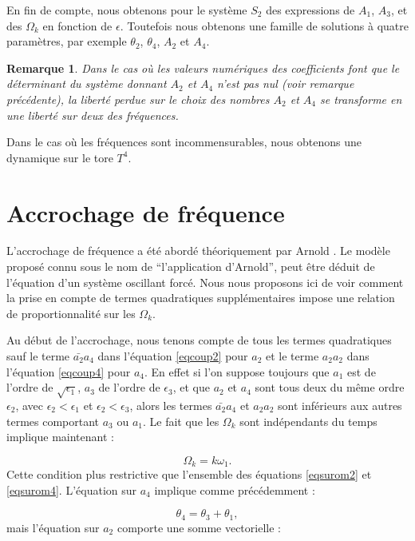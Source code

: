 \documentclass{book}
\newtheorem{rem}{Remarque}[chapter]
\begin{document}
En fin de compte, nous obtenons pour le syst\`eme $S_2$ des
expressions de $A_1$, $A_3$, et des $\Omega_k$ en fonction de
$\epsilon$. Toutefois nous obtenons une famille de solutions \`a quatre
param\`etres, par exemple $\theta_2$, $\theta_4$, $A_2$ et $A_4$.
\begin{rem}
Dans le cas o\`u les valeurs num\'eriques des coefficients font que le
d\'eterminant du syst\`eme donnant $A_2$ et $A_4$ n'est pas nul (voir
remarque pr\'ec\'edente), la libert\'e perdue sur le choix des nombres
$A_2$ et $A_4$ se transforme en une libert\'e sur deux des
fr\'equences. 
\end{rem}
Dans le cas o\`u les fr\'equences sont incommensurables, nous obtenons
une dynamique sur le tore $T^4$.


\section{Accrochage de fr\'equence}

L'accrochage de fr\'equence a \'et\'e abord\'e th\'eoriquement par
Arnold \cite{Arnold67,Nayfeh95}. Le mod\`ele propos\'e connu sous le
nom de ``l'application d'Arnold'', peut \^etre d\'eduit de
l'\'equation d'un syst\`eme oscillant forc\'e. Nous nous
proposons ici de voir comment la prise en compte de termes
quadratiques suppl\'ementaires impose une relation de
proportionnalit\'e sur les $\Omega_k$.

Au d\'ebut de l'accrochage, nous tenons compte de tous les termes
quadratiques sauf le terme  $\bar{a_2}a_4$ dans l'\'equation
\ref{eqcoup2} pour $a_2$
et le terme  $a_2a_2$   dans l'\'equation \ref{eqcoup4} pour $a_4$. En
effet si l'on 
suppose toujours que $a_1$ est de l'ordre de $\sqrt{\epsilon_1}$,
$a_3$ de l'ordre de $\epsilon_3$, et que $a_2$ et $a_4$ sont tous deux
du m\^eme ordre $\epsilon_2$, avec $\epsilon_2<\epsilon_1$ et
$\epsilon_2<\epsilon_3$, alors les termes  $\bar{a_2}a_4$ et $a_2a_2$
sont inf\'erieurs aux autres termes comportant $a_3$ ou $a_1$.
Le fait que les  $\Omega_k$ sont ind\'ependants du temps implique
maintenant :

\begin{equation}
\Omega_k=k\omega_1.
\end{equation}
Cette condition plus restrictive que l'ensemble des \'equations
\ref{eqsurom2} 
et \ref{eqsurom4}.
L'\'equation sur $a_4$ implique comme pr\'ec\'edemment
 :

\begin{equation}\label{relpha}
\theta_4=\theta_3+\theta_1,
\end{equation}
mais l'\'equation sur $a_2$ comporte une somme vectorielle :
\end{document}

